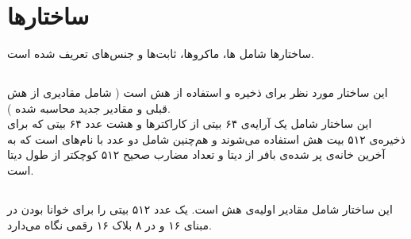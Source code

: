\section{ \textbf{ساختارها}}

\hspace{13mm} ساختارها شامل  ها، ماکروها، ثابت‌ها و جنس‌های تعریف شده است.

\subsection{}
\label{subsec:sph-skein-big-context}
این ساختار مورد نظر برای ذخیره و استفاده از هش است (‌ شامل مقادیری از هش قبلی و مقادیر جدید محاسبه شده ). \\ این ساختار شامل یک آرایه‌ی ۶۴ بیتی از کاراکترها  و   هشت عدد ۶۴ بیتی  که برای ذخیره‌ی ۵۱۲ بیت هش  استفاده می‌شوند  و هم‌چنین شامل دو عدد با نام‌های  است که  به آخرین خانه‌ی پر شده‌ی بافر از دیتا و  تعداد مضارب صحیح ۵۱۲ کوچکتر از طول دیتا است.


\subsection{}
\label{subsec:IV512}
این ساختار شامل مقادیر اولیه‌ی هش است. یک عدد ۵۱۲ بیتی را برای خوانا بودن در مبنای ۱۶ و در ۸ بلاک ۱۶ رقمی نگاه می‌دارد.
\subsection{}
\label{subsec:UBI-BIG}

